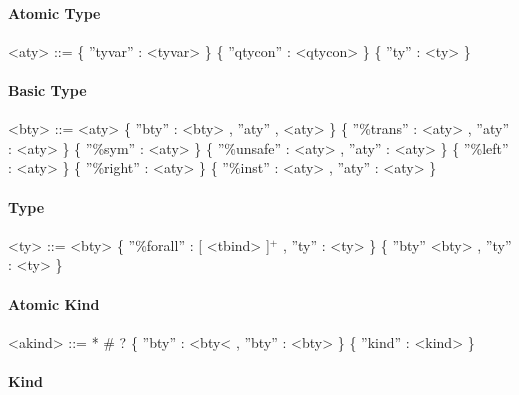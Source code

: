 \paragraph{Atomic Type}

\begin{grammar}
<aty>		  ::= 	 \{ ''tyvar'' : <tyvar> \}
		  \alt 	 \{ ''qtycon'' : <qtycon> \}
		  \alt   \{ ''ty'' : <ty> \}

\end{grammar}

\paragraph{Basic Type}

\begin{grammar}
<bty>		  ::= 	 <aty>
		  \alt 	 \{ ''bty'' : <bty> , ''aty'' , <aty> \}
		  \alt 	 \{ ''\%trans'' : <aty> , ''aty'' : <aty> \}
		  \alt 	 \{ ''\%sym'' : <aty> \}
		  \alt 	 \{ ''\%unsafe'' : <aty> , ''aty'' : <aty> \}	
		  \alt 	 \{ ''\%left'' : <aty> \}
		  \alt 	 \{ ''\%right'' : <aty> \}	
		  \alt 	 \{ ''\%inst'' : <aty> , ''aty'' : <aty> \}


\end{grammar}

\paragraph{Type}

\begin{grammar}

<ty>		  ::= 	 <bty>
		  \alt 	 \{ ''\%forall'' :  [ <tbind> ]$^+$ , ''ty'' : <ty> \}	
		  \alt 	 \{ ''bty'' <bty> , ''ty'' : <ty> \} 


\end{grammar}

\paragraph{Atomic Kind}

\begin{grammar}

<akind>		  ::= 	 *	
		  \alt 	 \#
		  \alt 	 ?	
		  \alt 	 \{ ''bty'' : <bty< , ''bty'' : <bty> \}
		  \alt 	 \{ ''kind'' : <kind> \}	


\end{grammar}

\paragraph{Kind}

